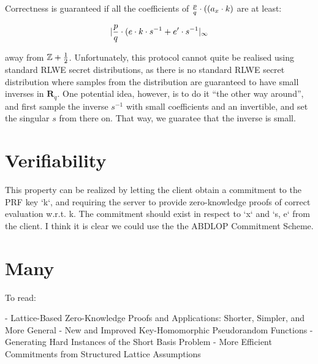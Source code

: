 Correctness is guaranteed if all the coefficients of ${p \over q} \cdot ((a_x \cdot k)$ are at least:

\begin{equation} \label{eq1}
| {p \over q} \cdot (e \cdot k \cdot s^{-1} + e' \cdot s^{-1}|_\infty
\end{equation}

away from $\mathbb{Z} + {1 \over 2}$.
Unfortunately, this protocol cannot quite be realised using standard RLWE secret distributions, as there is no standard RLWE secret distribution where samples from the distribution are guaranteed to have small inverses in $\mathbf{R}_q$.
One potential idea, however, is to do it ``the other way around'', and first sample the inverse $s^{-1}$ with small coefficients and an invertible, and set the singular $s$ from there on.
That way, we guaratee that the inverse is small.

\section{Verifiability}

This property can be realized by letting the client obtain a commitment to the PRF key `k`, and requiring the server to provide zero-knowledge proofs of correct evaluation w.r.t. k.
The commitment should exist in respect to `x` and `s, e` from the client.
I think it is clear we could use the the ABDLOP Commitment Scheme.

\section{Many}
To read:

- Lattice-Based Zero-Knowledge Proofs and Applications: Shorter, Simpler, and More General
- New and Improved Key-Homomorphic Pseudorandom Functions
- Generating Hard Instances of the Short Basis Problem
- More Efficient Commitments from Structured Lattice Assumptions


